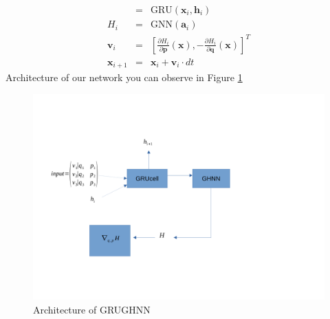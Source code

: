 \begin{eqnarray}
	[\mathbf{a}_i, \mathbf{h}_{i+1}] &=&  \text{GRU}(\mathbf{x}_i,\mathbf{h}_i)\\
	 H_i&=& \text{GNN}(\mathbf{a}_i)\\
	 \mathbf{v}_i&=&\left[\frac{\partial H_{i}}{\partial\mathbf{p}}(\mathbf{x}),-\frac{\partial H_{i}}{\partial\mathbf{q}}(\mathbf{x})\right]^T\\
	 \mathbf{x}_{i+1} &=& \mathbf{x}_i + \mathbf{v}_i \cdot dt
\end{eqnarray}
Architecture of our network you can observe in Figure \ref{GRUGHNN}
\begin{figure}[h!]
	\includegraphics[width=15cm]{chapters/chapter4/GRUGHNN}
	
	\caption{Architecture of GRUGHNN}
	\label{GRUGHNN}
\end{figure}
